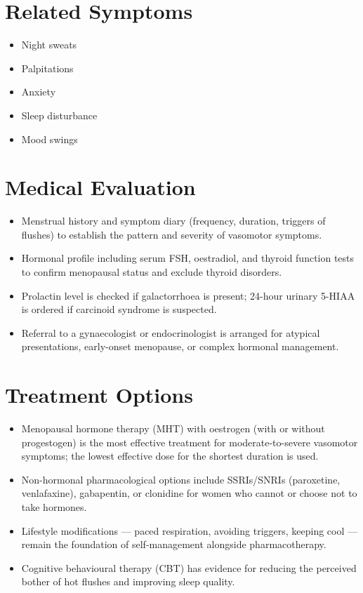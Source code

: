 \section*{Related Symptoms}
\begin{itemize}
  \item Night sweats
  \item Palpitations
  \item Anxiety
  \item Sleep disturbance
  \item Mood swings
\end{itemize}

\section*{Medical Evaluation}
\begin{itemize}
  \item Menstrual history and symptom diary (frequency, duration, triggers of flushes) to establish the pattern and severity of vasomotor symptoms.
  \item Hormonal profile including serum FSH, oestradiol, and thyroid function tests to confirm menopausal status and exclude thyroid disorders.
  \item Prolactin level is checked if galactorrhoea is present; 24-hour urinary 5-HIAA is ordered if carcinoid syndrome is suspected.
  \item Referral to a gynaecologist or endocrinologist is arranged for atypical presentations, early-onset menopause, or complex hormonal management.
\end{itemize}

\section*{Treatment Options}
\begin{itemize}
  \item Menopausal hormone therapy (MHT) with oestrogen (with or without progestogen) is the most effective treatment for moderate-to-severe vasomotor symptoms; the lowest effective dose for the shortest duration is used.
  \item Non-hormonal pharmacological options include SSRIs/SNRIs (paroxetine, venlafaxine), gabapentin, or clonidine for women who cannot or choose not to take hormones.
  \item Lifestyle modifications — paced respiration, avoiding triggers, keeping cool — remain the foundation of self-management alongside pharmacotherapy.
  \item Cognitive behavioural therapy (CBT) has evidence for reducing the perceived bother of hot flushes and improving sleep quality.
\end{itemize}

